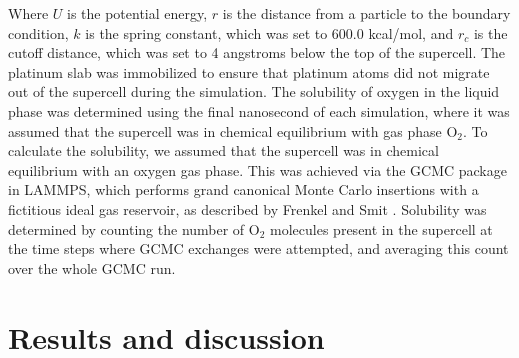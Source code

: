 \documentclass[journal=jacsat,manuscript=article]{achemso}
\begin{document}
Where $U$ is the potential energy, $r$ is the distance from a particle to the boundary condition, $k$ is the spring constant, which was set to 600.0 kcal/mol, and $r_c$ is the cutoff distance, which was set to 4 angstroms below the top of the supercell. The platinum slab was immobilized to ensure that platinum atoms did not migrate out of the supercell during the simulation. The solubility of oxygen in the liquid phase was determined using the final nanosecond of each simulation, where it was assumed that the supercell was in chemical equilibrium with gas phase O$_2$. To calculate the solubility, we assumed that the supercell was in chemical equilibrium with an oxygen gas phase. This was achieved via the GCMC package in LAMMPS, which performs grand canonical Monte Carlo insertions with a fictitious ideal gas reservoir, as described by Frenkel and Smit \cite{frenkel_understanding_2002}. Solubility was determined by counting the number of O$_2$ molecules present in the supercell at the time steps where GCMC exchanges were attempted, and averaging this count over the whole GCMC run.

\section{Results and discussion}
\end{document}
